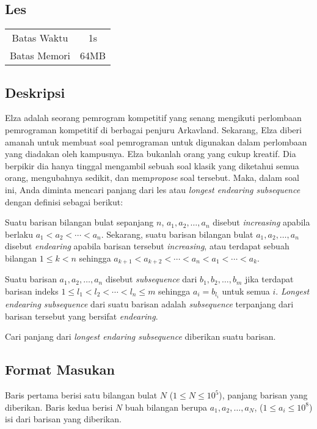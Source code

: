 \documentclass{article}
\begin{document}
\begin{center}
    \section*{Les} %

    \begin{tabular}{ | c c | }
        \hline
        Batas Waktu  & 1s \\    %
        Batas Memori & 64MB \\  %
        \hline
    \end{tabular}
\end{center}

\subsection*{Deskripsi}

Elza adalah seorang pemrogram kompetitif yang senang mengikuti perlombaan pemrograman kompetitif di berbagai penjuru Arkavland. Sekarang, Elza diberi amanah untuk membuat soal pemrograman untuk digunakan dalam perlombaan yang diadakan oleh kampusnya. Elza bukanlah orang yang cukup kreatif. Dia berpikir dia hanya tinggal mengambil sebuah soal klasik yang diketahui semua orang, mengubahnya sedikit, dan mem\textit{propose} soal tersebut. Maka, dalam soal ini, Anda diminta mencari panjang dari les atau \textit{longest endearing subsequence} dengan definisi sebagai berikut:

Suatu barisan bilangan bulat sepanjang $n$, $a_1, a_2, \ldots, a_n$ disebut \textit{increasing} apabila berlaku $a_1 < a_2 < \cdots < a_n$. Sekarang, suatu barisan bilangan bulat $a_1, a_2, \ldots, a_n$ disebut \textit{endearing} apabila barisan tersebut \textit{increasing}, atau terdapat sebuah bilangan $1 \leq k < n$ sehingga $a_{k+1} < a_{k+2} < \cdots < a_n < a_1 < \cdots < a_k$.

Suatu barisan $a_1, a_2, \ldots, a_n$ disebut \textit{subsequence} dari $b_1, b_2, \ldots, b_m$ jika terdapat barisan indeks $1 \leq l_1 < l_2 < \cdots < l_n \leq m$ sehingga $a_i = b_{l_i}$ untuk semua $i$. \textit{Longest endearing subsequence} dari suatu barisan adalah \textit{subsequence} terpanjang dari barisan tersebut yang bersifat \textit{endearing}.

Cari panjang dari \textit{longest endaring subsequence} diberikan suatu barisan.

\subsection*{Format Masukan}
Baris pertama berisi satu bilangan bulat $N$ ($1 \leq N \leq 10^5$), panjang barisan yang diberikan.
Baris kedua berisi $N$ buah bilangan berupa $a_1, a_2, \ldots, a_N$, ($1 \leq a_i \leq 10^8$) isi dari barisan yang diberikan.
\end{document}
